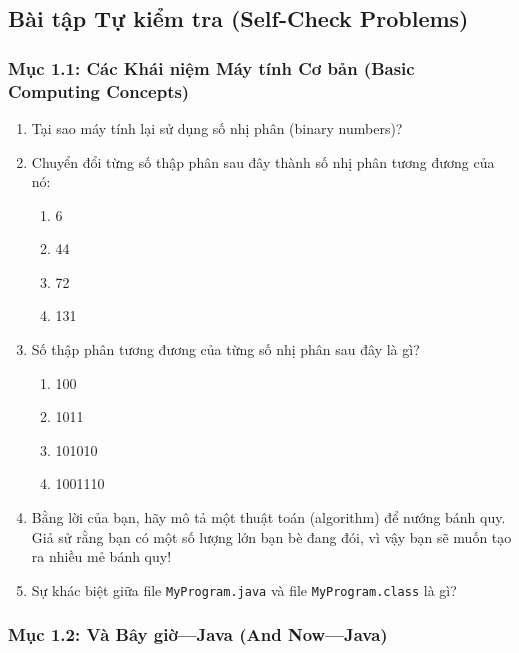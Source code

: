 \subsection{Bài tập Tự kiểm tra (Self-Check
Problems)}\label{buxe0i-tux1eadp-tux1ef1-kiux1ec3m-tra-self-check-problems}

\subsubsection{Mục 1.1: Các Khái niệm Máy tính Cơ bản (Basic Computing
Concepts)}\label{mux1ee5c-1.1-cuxe1c-khuxe1i-niux1ec7m-muxe1y-tuxednh-cux1a1-bux1ea3n-basic-computing-concepts}

\begin{enumerate}
\def\labelenumi{\arabic{enumi}.}
\tightlist
\item
  Tại sao máy tính lại sử dụng số nhị phân (binary numbers)?
\item
  Chuyển đổi từng số thập phân sau đây thành số nhị phân tương đương của
  nó:

  \begin{enumerate}
  \def\labelenumii{\alph{enumii}.}
  \tightlist
  \item
    6
  \item
    44
  \item
    72
  \item
    131
  \end{enumerate}
\item
  Số thập phân tương đương của từng số nhị phân sau đây là gì?

  \begin{enumerate}
  \def\labelenumii{\alph{enumii}.}
  \tightlist
  \item
    100
  \item
    1011
  \item
    101010
  \item
    1001110
  \end{enumerate}
\item
  Bằng lời của bạn, hãy mô tả một thuật toán (algorithm) để nướng bánh
  quy. Giả sử rằng bạn có một số lượng lớn bạn bè đang đói, vì vậy bạn
  sẽ muốn tạo ra nhiều mẻ bánh quy!
\item
  Sự khác biệt giữa file \texttt{MyProgram.java} và file
  \texttt{MyProgram.class} là gì?
\end{enumerate}

\subsubsection{Mục 1.2: Và Bây giờ---Java (And
Now---Java)}\label{mux1ee5c-1.2-vuxe0-buxe2y-giux1eddjava-and-nowjava}

